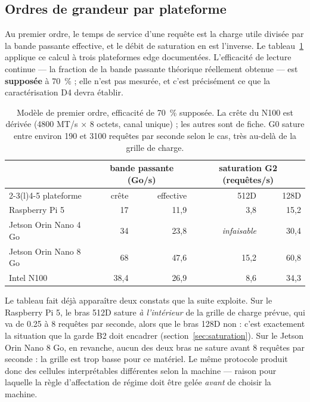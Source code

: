 \documentclass[11pt,a4paper]{article}
\begin{document}
\subsection{Ordres de grandeur par plateforme}

Au premier ordre, le temps de service d'une requête est la charge utile divisée par
la bande passante effective, et le débit de saturation en est l'inverse. Le
tableau~\ref{tab:saturation} applique ce calcul à trois plateformes edge
documentées. L'efficacité de lecture continue — la fraction de la bande passante
théorique réellement obtenue — est \textbf{supposée} à \SI{70}{\percent} ; elle
n'est pas mesurée, et c'est précisément ce que la caractérisation D4 devra
établir.

\begin{table}[h]
\centering\small
\begin{tabular}{@{}lrrrr@{}}
\toprule
& \multicolumn{2}{c}{bande passante (Go/s)} & \multicolumn{2}{c}{saturation G2 (requêtes/s)} \\
\cmidrule(lr){2-3}\cmidrule(l){4-5}
plateforme & crête & effective & 512D & 128D \\
\midrule
Raspberry Pi 5 & 17 & 11,9 & 3,8 & 15,2 \\
Jetson Orin Nano 4 Go & 34 & 23,8 & \emph{infaisable} & 30,4 \\
Jetson Orin Nano 8 Go & 68 & 47,6 & 15,2 & 60,8 \\
Intel N100 & 38,4 & 26,9 & 8,6 & 34,3 \\
\bottomrule
\end{tabular}
\caption{Modèle de premier ordre, efficacité de \SI{70}{\percent} supposée. La
crête du N100 est dérivée (\num{4800} MT/s × 8 octets, canal unique) ; les autres
sont de fiche. G0 sature entre environ 190 et \num{3100} requêtes par seconde selon
le cas, très au-delà de la grille de charge.}
\label{tab:saturation}
\end{table}

Le tableau fait déjà apparaître deux constats que la suite exploite. Sur le
Raspberry Pi 5, le bras 512D sature \emph{à l'intérieur} de la grille de charge
prévue, qui va de \num{0,25} à 8 requêtes par seconde, alors que le bras 128D non :
c'est exactement la situation que la garde B2 doit encadrer
(section~\ref{sec:saturation}). Sur le Jetson Orin Nano 8 Go, en revanche, aucun des
deux bras ne sature avant 8 requêtes par seconde : la grille est trop basse pour ce
matériel. Le même protocole produit donc des cellules interprétables différentes
selon la machine — raison pour laquelle la règle d'affectation de régime doit être
gelée \emph{avant} de choisir la machine.
\end{document}
